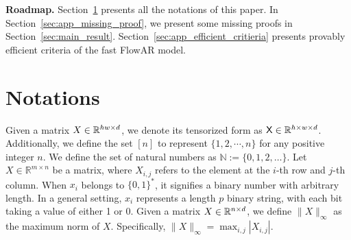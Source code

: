 {\bf Roadmap.} Section~\ref{sec:app_notations} presents all the notations of this paper. In Section~\ref{sec:app_missing_proof}, we present some missing proofs in Section~\ref{sec:main_result}. Section~\ref{sec:app_efficient_critieria} presents provably efficient criteria of the fast FlowAR model.


\section{Notations}\label{sec:app_notations}
Given a matrix $X \in \mathbb{R}^{hw \times d}$, we denote its tensorized form as $\mathsf{X} \in \mathbb{R}^{h \times w \times d}$. Additionally, we define the set $[n]$ to represent $\{1,2,\cdots, n\}$ for any positive integer $n$. We define the set of natural numbers as $\mathbb{N}:= \{0,1,2,\dots\}$. Let $X \in \mathbb{R}^{m \times n}$ be a matrix, where $X_{i,j}$ refers to the element at the $i$-th row and $j$-th column. When $x_i$ belongs to $\{ 0,1 \}^*$, it signifies a binary number with arbitrary length. In a general setting, $x_i$ represents a length $p$ binary string, with each bit taking a value of either 1 or 0. Given a matrix $X \in \mathbb{R}^{n \times d}$, we define $\|X\|_\infty  $ as the maximum norm of $X$. Specifically, $\|X\|_\infty = \max_{i,j} |X_{i,j}|$. 